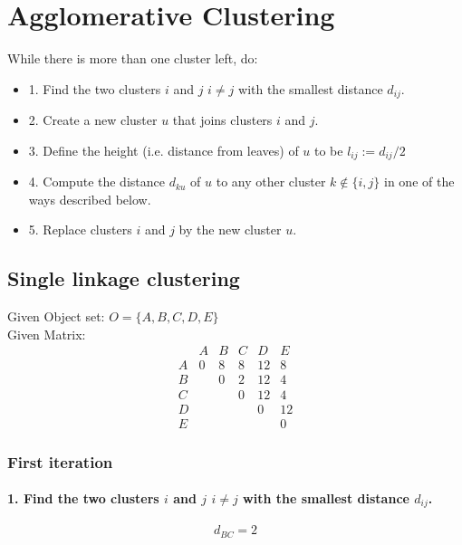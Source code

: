 

\newcommand{\thegivenstuff}[0]{
Given Object set: $O = \{A, B, C, D, E\}$ \\ \newline
Given Matrix: 
\[
\begin{array}{c|ccccc}
  & A & B & C & D & E \\
\hline
A & 0 & 8 & 8 & 12 & 8 \\
B &   & 0 & 2 & 12 & 4 \\
C &   &   & 0 & 12 & 4 \\
D &   &   &   & 0 & 12 \\
E &   &   &   &   & 0
\end{array}
\]
}



\newcommand{\stepone}[0]{1. Find the two clusters $i$ and $j$ $i \neq j$ with the smallest distance $d_{ij}$.}
\newcommand{\steptwo}[0]{2. Create a new cluster $u$ that joins clusters $i$ and $j$.}
\newcommand{\stepthree}[0]{3. Define the height (i.e. distance from leaves) of $u$ to be $l_{ij} := d_{ij} /2$}
\newcommand{\stepfour}[0]{4. Compute the distance $d_{ku}$ of $u$ to any other cluster $k \notin \{i, j\}$ in one of the ways described below.}
\newcommand{\stepfive}[0]{5. Replace clusters $i$ and $j$ by the new cluster $u$.}



\chapter{Agglomerative Clustering}
While there is more than one cluster left, do:
\begin{itemize}
    \item[] \stepone
    \item[] \steptwo
    \item[] \stepthree
    \item[] \stepfour
    \item[] \stepfive
\end{itemize}

\section{Single linkage clustering}
\thegivenstuff
\subsection*{First iteration}
\subsubsection{\stepone}
\[
d_{BC} = 2
\]
